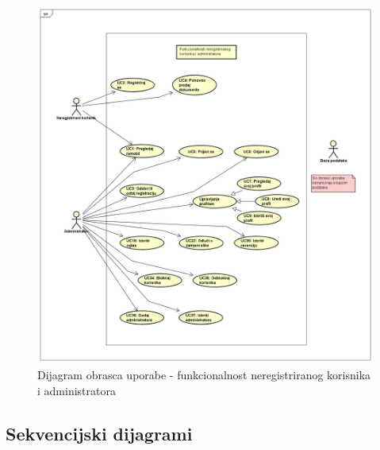 					\begin{figure} [H]
						
						\includegraphics[width=1\linewidth]{dijagrami/neregistrirani_i_admin.png}
						\centering
						\caption{Dijagram obrasca uporabe - funkcionalnost neregistriranog korisnika i administratora}
						\label{fig:Dijagram obrasca uporabe - funkcionalnost neregistriranog korisnika i administratora}
					\end{figure}
					
					
					
				\eject		
				
			\subsection{Sekvencijski dijagrami}

